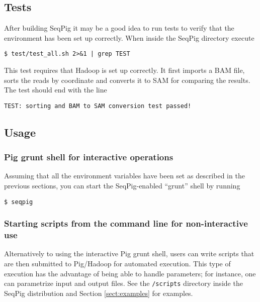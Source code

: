 \subsection{Tests}

After building SeqPig it may be a good idea to run tests to verify that
the environment has been set up correctly. When inside the SeqPig directory
execute
\begin{lstlisting} 
$ test/test_all.sh 2>&1 | grep TEST
\end{lstlisting}
This test requires that Hadoop is set up correctly. It first imports a BAM
file, sorts the reads by coordinate and converts it to SAM for comparing
the results. The test should end with the line
\begin{lstlisting}
TEST: sorting and BAM to SAM conversion test passed!
\end{lstlisting}

\subsection{Usage}

\subsubsection{Pig grunt shell for interactive operations}
Assuming that all the environment variables have been set as described in the
previous sections, you can start the SeqPig-enabled ``grunt'' shell by running
%
\begin{lstlisting}
$ seqpig
\end{lstlisting}
%
\subsubsection{Starting scripts from the command line for non-interactive use}
Alternatively to using the interactive Pig grunt shell, users can write scripts
that are then submitted to Pig/Hadoop for automated execution. This type of
execution has the advantage of being able to handle parameters; for instance,
one can parametrize input and output files. See the {\tt /scripts} directory
inside the SeqPig distribution and Section \ref{sect:examples} for examples.
